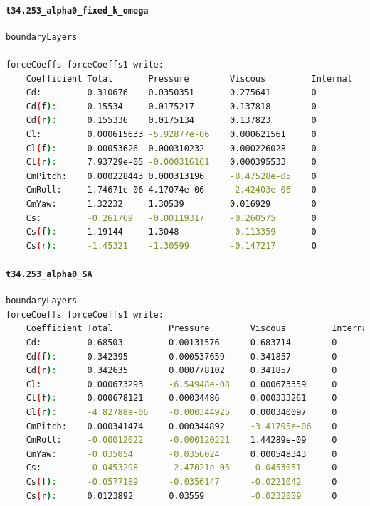 \documentclass[12pt]{article}
\begin{document}
\paragraph{\texttt{t34.253\_alpha0\_fixed\_k\_omega}}
\begin{lstlisting}[caption=t34.253\_alpha0\_fixed\_k\_omega. Aerodynamic coefficients obtained with the the baseline $k$-$\omega$ SST model after fixing the values of turbulence fields of $k$ and $\omega$., label=lst:test_fix_wo, language=sh]
boundaryLayers

forceCoeffs forceCoeffs1 write:
    Coefficient Total       Pressure        Viscous         Internal
    Cd:         0.310676    0.0350351       0.275641        0
    Cd(f):      0.15534     0.0175217       0.137818        0
    Cd(r):      0.155336    0.0175134       0.137823        0
    Cl:         0.000615633 -5.92877e-06    0.000621561     0
    Cl(f):      0.00053626  0.000310232     0.000226028     0
    Cl(r):      7.93729e-05 -0.000316161    0.000395533     0
    CmPitch:    0.000228443 0.000313196     -8.47528e-05    0
    CmRoll:     1.74671e-06 4.17074e-06     -2.42403e-06    0
    CmYaw:      1.32232     1.30539         0.016929        0
    Cs:         -0.261769   -0.00119317     -0.260575       0
    Cs(f):      1.19144     1.3048          -0.113359       0
    Cs(r):      -1.45321    -1.30599        -0.147217       0
\end{lstlisting}

\paragraph{\texttt{t34.253\_alpha0\_SA}}
\begin{lstlisting}[caption=t34.253\_alpha0\_SA. Aerodynamic coefficients obtained with the the Spalart-Allmaras turbulence model using the old $R_0$ mesh., label=lst:testSA, language=bash]
boundaryLayers
forceCoeffs forceCoeffs1 write:
    Coefficient Total           Pressure        Viscous         Internal
    Cd:         0.68503         0.00131576      0.683714        0
    Cd(f):      0.342395        0.000537659     0.341857        0
    Cd(r):      0.342635        0.000778102     0.341857        0
    Cl:         0.000673293     -6.54948e-08    0.000673359     0
    Cl(f):      0.000678121     0.00034486      0.000333261     0
    Cl(r):      -4.82788e-06    -0.000344925    0.000340097     0
    CmPitch:    0.000341474     0.000344892     -3.41795e-06    0
    CmRoll:     -0.00012022     -0.000120221    1.44289e-09     0
    CmYaw:      -0.035054       -0.0356024      0.000548343     0
    Cs:         -0.0453298      -2.47021e-05    -0.0453051      0
    Cs(f):      -0.0577189      -0.0356147      -0.0221042      0
    Cs(r):      0.0123892       0.03559         -0.0232009      0
\end{lstlisting}
%
\end{document}
